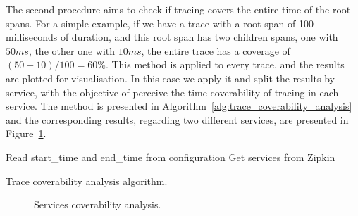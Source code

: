 
The second procedure aims to check if tracing covers the entire time of the root spans. For a simple example, if we have a trace with a root span of 100 milliseconds of duration, and this root span has two children spans, one with $50ms$, the other one with $10ms$, the entire trace has a coverage of $(50+10)/100=60\%$. This method is applied to every trace, and the results are plotted for visualisation. In this case we apply it and split the results by service, with the objective of perceive the time coverability of tracing in each service. The method is presented in Algorithm~\ref{alg:trace_coverability_analysis} and the corresponding results, regarding two different services, are presented in Figure~\ref{fig:services_coverability_analysis}.

\begin{algorithm}
  Read start\_time and end\_time from configuration\;
  Get services from Zipkin\;
  \caption{Trace coverability analysis algorithm.}
  \label{alg:trace_coverability_analysis_2}
\end{algorithm}

\begin{figure}
  \caption{Services coverability analysis.}
  \label{fig:services_coverability_analysis}
\end{figure}

